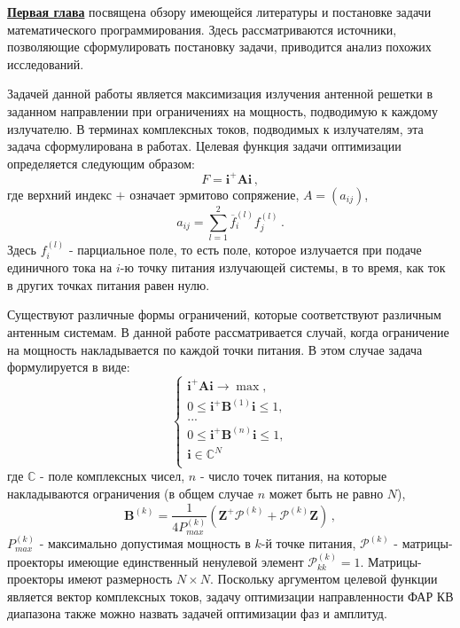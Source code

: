 \underline{\textbf{Первая глава}} посвящена обзору имеющейся литературы и постановке задачи математического программирования. Здесь рассматриваются источники, позволяющие сформулировать постановку задачи\autocite{sazonov:PAA,yurkov:farkv}, приводится анализ похожих исследований\autocite{luo:sdp}.

Задачей данной работы является максимизация излучения антенной решетки в заданном направлении при ограничениях на мощность, подводимую к каждому излучателю. В терминах комплексных токов, подводимых к излучателям, эта задача сформулирована в работах\autocite{yurkov:farkv, yurkov:knd}. Целевая функция задачи оптимизации определяется следующим образом:
%
    \begin{equation}
        F = \textbf{i}^{+}\textbf{Ai} \, ,
        \label{eq:F}
    \end{equation}
%
где верхний индекс $+$ означает эрмитово сопряжение, $A = (a_{ij})$,
%
     \begin{equation}
        a_{ij} = \sum_{l=1}^2\overline{f}_{i}^{(l)}f_{j}^{(l)}
        \label{eq:A} \, .
    \end{equation}
%
Здесь $f_i^{(l)}$ - парциальное поле, то есть поле, которое излучается при подаче единичного тока на $i$-ю точку питания излучающей системы, в то время, как ток в других точках питания равен нулю.

Существуют различные формы ограничений, которые соответствуют различным антенным системам. В данной работе рассматривается случай, когда ограничение на мощность накладывается по каждой точки питания. В этом случае задача формулируется в виде:
%
    \begin{equation}
        \begin{cases}
           \textbf{i}^{+}\textbf{Ai} \rightarrow \max,\\
           0 \leq \textbf{i}^{+}\textbf{B}^{(1)}\textbf{i} \leq 1, \\
           ...\\
           0 \leq \textbf{i}^{+}\textbf{B}^{(n)}\textbf{i} \leq 1,\\
           \textbf{i} \in \mathbb{C}^N\\
         \end{cases}
         \label{eq:task2}
    \end{equation}
%
где $\mathbb{C}$ - поле комплексных чисел, $n$ - число точек питания, на которые накладываются ограничения (в общем случае $n$ может быть не равно $N$),
%
    \begin{equation}
        \textbf{B}^{(k)} = \frac{1}{4P_{max}^{(k)}}(\textbf{Z}^{+}\mathcal{P}^{(k)} + \mathcal{P}^{(k)}\textbf{Z}) \, ,
    \end{equation}
%
$P_{max}^{(k)}$ - максимально допустимая мощность в $k$-й точке питания, $\mathcal{P}^{(k)}$ - матрицы-проекторы имеющие единственный ненулевой элемент $\mathcal{P}^{(k)}_{kk}=1$. Матрицы-проекторы имеют размерность $N \times N$. Поскольку аргументом целевой функции является вектор комплексных токов, задачу оптимизации направленности ФАР КВ диапазона также можно назвать задачей оптимизации фаз и амплитуд.

